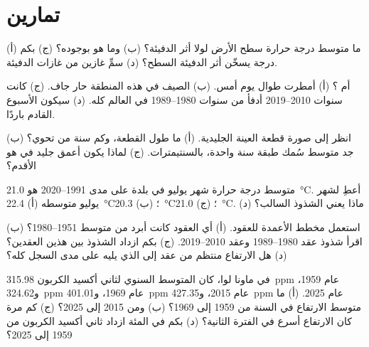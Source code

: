 \section{تمارين}

\begin{exercise}[$\star$]\label{exo:g9:climate-past-and-present:1}
(أ) ما متوسط درجة حرارة سطح الأرض لولا أثر الدفيئة؟ (ب) وما هو بوجوده؟
(ج) بكم درجة يسخّن أثر الدفيئة السطح؟ (د) سمِّ غازين من غازات
الدفيئة.
\end{exercise}

\begin{exercise}[$\star$]\label{exo:g9:climate-past-and-present:2}
 أم ؟ (أ) أمطرت طوال يوم أمس. (ب) الصيف في هذه المنطقة حار جاف.
(ج) كانت سنوات 2010--2019 أدفأ من سنوات 1980--1989 في العالم كله. (د) سيكون
الأسبوع القادم باردًا.
\end{exercise}

\begin{exercise}[$\star$]\label{exo:g9:climate-past-and-present:3}
انظر إلى صورة قطعة العينة الجليدية. (أ) ما طول القطعة، وكم سنة من  تحوي؟
(ب) جد متوسط سُمك طبقة سنة واحدة، بالسنتيمترات. (ج) لماذا يكون أعمق جليد في
 هو الأقدم؟
\end{exercise}

\begin{exercise}[$\star$]\label{exo:g9:climate-past-and-present:4}
متوسط درجة حرارة شهر يوليو في بلدة على مدى 1991--2020 هو
\qty{21.0}{\degreeCelsius}. أعطِ  لشهر يوليو متوسطه
(أ) \qty{22.4}{\degreeCelsius}؛ (ب) \qty{20.3}{\degreeCelsius}؛
(ج) \qty{21.0}{\degreeCelsius}. (د) ماذا يعني الشذوذ السالب؟
\end{exercise}

\begin{exercise}[$\star\star$]\label{exo:g9:climate-past-and-present:5}
استعمل مخطط الأعمدة للعقود. (أ) أي العقود كانت أبرد من متوسط 1951--1980؟
(ب) اقرأ شذوذ عقد 1980--1989 وعقد 2010--2019. (ج) بكم ازداد الشذوذ بين هذين
العقدين؟ (د) هل الارتفاع منتظم من عقد إلى الذي يليه على مدى السجل
كله؟
\end{exercise}

\begin{exercise}[$\star\star$]\label{exo:g9:climate-past-and-present:6}
في ماونا لوا، كان المتوسط السنوي لثاني أكسيد الكربون \qty{315.98}{ppm} عام
1959، و\qty{324.62}{ppm} عام 1969، و\qty{401.01}{ppm} عام 2015، و\qty{427.35}{ppm} عام 2025. (أ) ما
متوسط الارتفاع في السنة من 1959 إلى 1969؟ (ب) ومن 2015 إلى 2025؟ (ج) كم مرة
كان الارتفاع أسرع في الفترة الثانية؟ (د) بكم في المئة ازداد ثاني أكسيد الكربون
من 1959 إلى 2025؟
\end{exercise}


